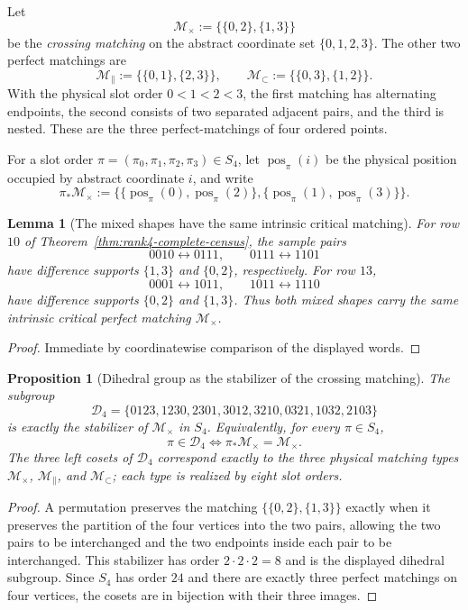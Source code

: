 \documentclass[11pt]{article}
\newtheorem{lemma}[definition]{Lemma}
\newtheorem{proposition}[definition]{Proposition}
\begin{document}
Let
\[
 \mathcal M_{\times}
 :=\bigl\{\{0,2\},\{1,3\}\bigr\}
\]
be the \emph{crossing matching} on the abstract coordinate set
$\{0,1,2,3\}$.  The other two perfect matchings are
\[
 \mathcal M_{\parallel}
 :=\bigl\{\{0,1\},\{2,3\}\bigr\},
 \qquad
 \mathcal M_{\subset}
 :=\bigl\{\{0,3\},\{1,2\}\bigr\}.
\]
With the physical slot order $0<1<2<3$, the first matching has alternating
endpoints, the second consists of two separated adjacent pairs, and the third
is nested.  These are the three perfect-matchings of four ordered points.

For a slot order $\pi=(\pi_0,\pi_1,\pi_2,\pi_3)\in S_4$, let
$\operatorname{pos}_{\pi}(i)$ be the physical position occupied by abstract
coordinate $i$, and write
\[
 \pi_*\mathcal M_{\times}
 :=
 \bigl\{
   \{\operatorname{pos}_{\pi}(0),\operatorname{pos}_{\pi}(2)\},
   \{\operatorname{pos}_{\pi}(1),\operatorname{pos}_{\pi}(3)\}
 \bigr\}.
\]

\begin{lemma}[The mixed shapes have the same intrinsic critical matching]
\label{lem:mixed-critical-matching}
For row $10$ of Theorem~\ref{thm:rank4-complete-census}, the sample pairs
\[
 0010\leftrightarrow0111,
 \qquad
 0111\leftrightarrow1101
\]
have difference supports $\{1,3\}$ and $\{0,2\}$, respectively.  For row $13$,
\[
 0001\leftrightarrow1011,
 \qquad
 1011\leftrightarrow1110
\]
have difference supports $\{0,2\}$ and $\{1,3\}$.  Thus both mixed shapes
carry the same intrinsic critical perfect matching
$\mathcal M_{\times}$.
\end{lemma}

\begin{proof}
Immediate by coordinatewise comparison of the displayed words.
\end{proof}

\begin{proposition}[Dihedral group as the stabilizer of the crossing matching]
\label{prop:d4-stabilizer-matching}
The subgroup
\[
 \mathcal D_4
 =\{0123,1230,2301,3012,3210,0321,1032,2103\}
\]
is exactly the stabilizer of $\mathcal M_{\times}$ in $S_4$.  Equivalently,
for every $\pi\in S_4$,
\[
 \pi\in\mathcal D_4
 \iff
 \pi_*\mathcal M_{\times}=\mathcal M_{\times}.
\]
The three left cosets of $\mathcal D_4$ correspond exactly to the three
physical matching types
$\mathcal M_{\times}$, $\mathcal M_{\parallel}$, and
$\mathcal M_{\subset}$; each type is realized by eight slot orders.
\end{proposition}

\begin{proof}
A permutation preserves the matching
$\{\{0,2\},\{1,3\}\}$ exactly when it preserves the partition of the four
vertices into the two pairs, allowing the two pairs to be interchanged and the
two endpoints inside each pair to be interchanged.  This stabilizer has order
$2\cdot2\cdot2=8$ and is the displayed dihedral subgroup.  Since $S_4$ has
order $24$ and there are exactly three perfect matchings on four vertices, the
cosets are in bijection with their three images.
\end{proof}
\end{document}
